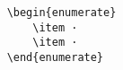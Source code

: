 \begin{verbatim}
    \begin{enumerate}
        \item ·
        \item ·
    \end{enumerate}
\end{verbatim}